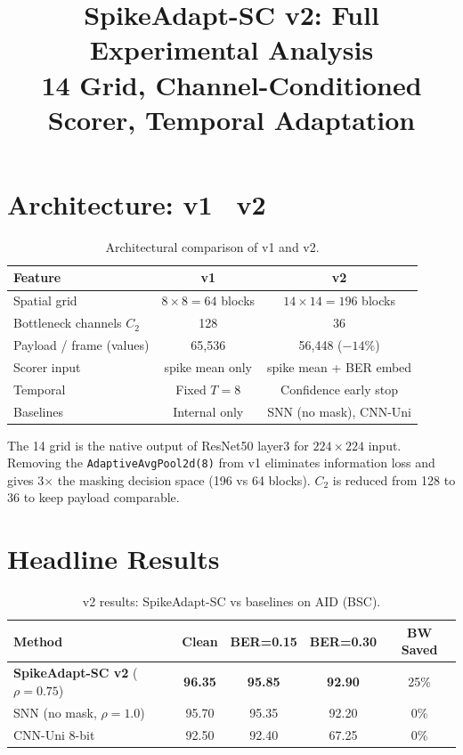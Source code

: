\documentclass[conference]{IEEEtran}
\begin{document}
\title{SpikeAdapt-SC v2: Full Experimental Analysis\\
\large{14 Grid, Channel-Conditioned Scorer, Temporal Adaptation}}
\maketitle

\section{Architecture: v1 \textrightarrow\ v2}

\begin{table}[h]
\centering
\caption{Architectural comparison of v1 and v2.}
\begin{tabular}{@{}l c c@{}}
\toprule
\textbf{Feature} & \textbf{v1} & \textbf{v2} \\
\midrule
Spatial grid & $8{\times}8 = 64$ blocks & $14{\times}14 = 196$ blocks \\
Bottleneck channels $C_2$ & 128 & 36 \\
Payload / frame (values) & 65,536 & 56,448 ($-14\%$) \\
Scorer input & spike mean only & spike mean + BER embed \\
Temporal & Fixed $T{=}8$ & Confidence early stop \\
Baselines & Internal only & SNN (no mask), CNN-Uni \\
\bottomrule
\end{tabular}
\end{table}

The 14 grid is the native output of ResNet50 layer3 for $224{\times}224$ input. Removing the \texttt{AdaptiveAvgPool2d(8)} from v1 eliminates information loss and gives 3$\times$ the masking decision space (196 vs 64 blocks). $C_2$ is reduced from 128 to 36 to keep payload comparable.


\section{Headline Results}

\begin{table}[h]
\centering
\caption{v2 results: SpikeAdapt-SC vs baselines on AID (BSC).}
\begin{tabular}{@{}l c c c c@{}}
\toprule
\textbf{Method} & \textbf{Clean} & \textbf{BER=0.15} & \textbf{BER=0.30} & \textbf{BW Saved} \\
\midrule
\textbf{SpikeAdapt-SC v2} ($\rho{=}0.75$) & \textbf{96.35} & \textbf{95.85} & \textbf{92.90} & 25\% \\
SNN (no mask, $\rho{=}1.0$) & 95.70 & 95.35 & 92.20 & 0\% \\
CNN-Uni 8-bit & 92.50 & 92.40 & 67.25 & 0\% \\
\bottomrule
\end{tabular}
\end{table}
\end{document}
